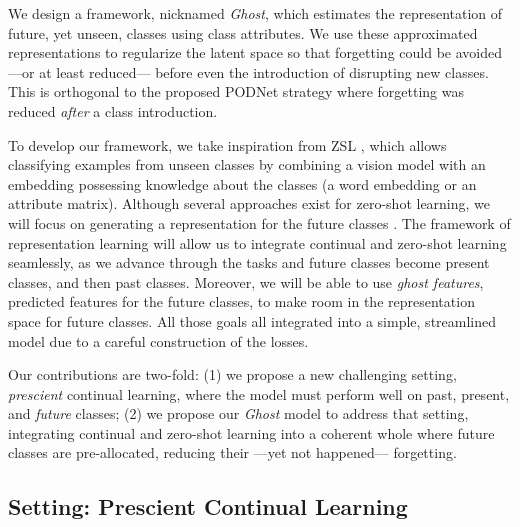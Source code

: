 We design a framework, nicknamed \textit{Ghost}, which estimates the representation of future, yet
unseen, classes using class attributes. We use these approximated representations to regularize the
latent space so that forgetting could be avoided ---or at least reduced--- before even the
introduction of disrupting new classes. This is orthogonal to the proposed PODNet strategy where
forgetting was reduced \textit{after} a class introduction.

To develop our framework, we take inspiration from \acf{ZSL}
\citep{lampert2009zeroshot,xian2019awa2}, which allows classifying examples from unseen classes by
combining a vision model with an embedding possessing knowledge about the classes (\eg a word
embedding \citep{mikolov2013word2vec,pennington2014glove} or an attribute matrix). Although several
approaches exist for zero-shot learning, we will focus on generating a representation for the future
classes \citep{bucher2017zeroshot_gmmn, kumar2018synthesized_zeroshot,
    xian2018feature_generating_zeroshot}. The framework of representation learning will allow us to
integrate continual and zero-shot learning seamlessly, as we advance through the tasks and future
classes become present classes, and then past classes. Moreover, we will be able to use
\textit{ghost features}, predicted features for the future classes, to make room in the
representation space for future classes. All those goals all integrated into a simple, streamlined
model due to a careful construction of the losses.

Our contributions are two-fold: (1) we propose a new challenging setting, \textit{prescient}
continual learning, where the model must perform well on past, present, and \textit{future} classes;
(2) we propose our \textit{Ghost} model to address that setting, integrating continual and zero-shot
learning into a coherent whole where future classes are pre-allocated, reducing their ---yet not
happened--- forgetting.


\subsection{Setting: Prescient Continual Learning}
\label{sec:ghost_setting}

